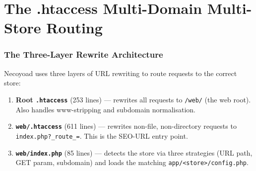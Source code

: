 \documentclass[11pt,a4paper]{article}
\begin{document}
\part{The .htaccess Multi-Domain Multi-Store Routing}\label{part:htaccess}

\section{The Three-Layer Rewrite Architecture}\label{sec:three-layers}

Necoyoad uses three layers of URL rewriting to route requests to the
correct store:

\begin{enumerate}[leftmargin=1.6em,itemsep=2pt]
  \item \textbf{Root \texttt{.htaccess}} (253 lines) --- rewrites all
        requests to \texttt{/web/} (the web root). Also handles
        www-stripping and subdomain normalisation.
  \item \textbf{\texttt{web/.htaccess}} (611 lines) --- rewrites
        non-file, non-directory requests to
        \texttt{index.php?\_route\_=}. This is the SEO-URL entry point.
  \item \textbf{\texttt{web/index.php}} (85 lines) --- detects the
        store via three strategies (URL path, GET param, subdomain)
        and loads the matching \texttt{app/<store>/config.php}.
\end{enumerate}
\end{document}
